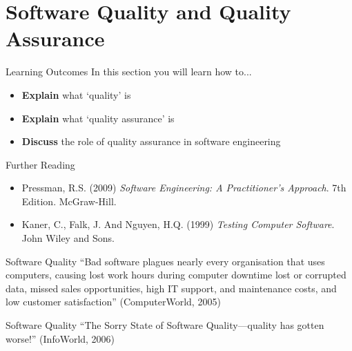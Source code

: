 \part{Software Quality and Quality Assurance}
\frame{\partpage}

\begin{frame}{Learning Outcomes}
	In this section you will learn how to...
	
	\begin{itemize}
		\item \textbf{Explain} what `quality' is
		\item \textbf{Explain} what `quality assurance' is
		\item \textbf{Discuss} the role of quality assurance in software engineering
	\end{itemize}
\end{frame}

\begin{frame}{Further Reading}
	\begin{itemize}
		\item Pressman, R.S. (2009) \textit{Software Engineering: A Practitioner's Approach}. 7th Edition. McGraw-Hill.
		\item Kaner, C., Falk, J. And Nguyen, H.Q. (1999) \textit{Testing Computer Software}. John Wiley and Sons.
	\end{itemize}
\end{frame}

\begin{frame}{Software Quality}
    ``Bad software plagues nearly every organisation that uses computers, causing lost work hours during computer downtime
    lost or corrupted data, missed sales opportunities, high IT support, and maintenance costs, and low customer satisfaction''
    \vspace{2ex}
    (ComputerWorld, 2005)
\end{frame}

\begin{frame}{Software Quality}
    ``The Sorry State of Software Quality---quality has gotten worse!''
    \vspace{2ex}
    (InfoWorld, 2006)
\end{frame}

